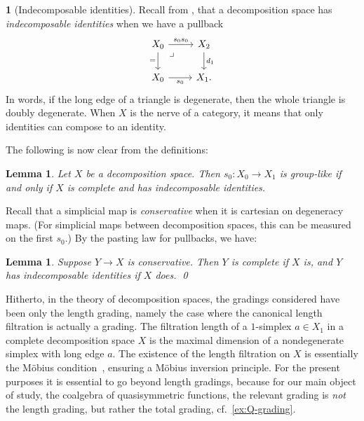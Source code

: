 \documentclass{amsart}
\newcommand{\xora}{a}
\newcommand{\drpullback}{\arrow[phantom]{dr}[very near start,description]{\lrcorner}}
\newtheorem{lemma}[theorem]{Lemma}
\theoremstyle{definition}
\theoremstyle{noname}
\newtheorem{blanko}[theorem]{}
\begin{document}
\begin{blanko}[Indecomposable identities]\label{indecomposable}
  Recall from \cite{Lawvere-Menni}, \cite[5.5]{GKT2} that a decomposition space has {\em indecomposable identities}  when
  we have a pullback
  \[
    \begin{tikzcd}
  X_0 \drpullback \ar[d,"="'] \ar[r, "s_0 s_0"] & X_2 \ar[d, "d_1"]  \\
  X_0 \ar[r, "s_0"'] & X_1  .
  \end{tikzcd}
\]
 In words, if the long edge of a triangle is degenerate, then the whole 
 triangle is doubly degenerate.
 When $X$ is the nerve of a category, it means that only identities can compose 
 to an identity.
\end{blanko}

\normalsize
The following is now clear from the definitions:
\begin{lemma}\label{degen are grouplike}
Let $X$ be a decomposition space. Then $s_0 \colon X_0 \to X_1$ is group-like
if and only if
  $X$ is complete and has indecomposable identities.
\end{lemma}

  Recall that a simplicial map is 
  {\em conservative} when it is cartesian on degeneracy maps. (For simplicial maps 
  between decomposition spaces, this can be measured on the first $s_0$.)
By the pasting law for pullbacks, we have:

\begin{lemma}\label{cons/complete+indecomp}
Suppose $Y\to X$ is conservative. 
Then $Y$ is complete if $X$ is, and $Y$ has indecomposable identities if $X$ does. \qed
\end{lemma}


Hitherto, in the theory of decomposition spaces, the gradings considered have
been only the length grading, namely the case where the canonical length
filtration is actually a grading. The filtration length of a $1$-simplex $\xora\in
X_1$ in a complete decomposition space $X$ is the maximal dimension of a 
nondegenerate simplex
with long edge $\xora$. The existence of the length filtration on $X$
is essentially the
Möbius condition~\cite{GKT2}, ensuring a Möbius
inversion principle. For the present purposes it is essential to go beyond length
gradings, because for our main object of study, 
the coalgebra of quasisymmetric functions, the relevant grading
is {\em not} the length 
grading, but rather the total grading, cf.~\ref{ex:Q-grading}.
\end{document}
